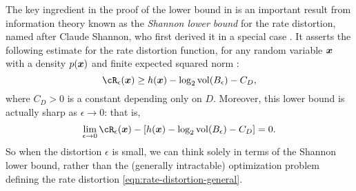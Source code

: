 \documentclass[../../book-main.tex]{subfiles}
\begin{document}
\begin{remark}\label{rem:slb}
	The key ingredient in the proof of the lower bound in
	 is an important result from
	information theory known as the \textit{Shannon lower bound} for the rate
	distortion, named after Claude Shannon, who first derived it in a special case
	\cite{shannon1959coding}. It
	asserts the following estimate for the rate distortion function, for any random
	variable $\bm{x}$ with
	a density $p(\bm{x})$ and finite expected squared norm \cite{Linder1994-ej}:
	\begin{equation}\label{eq:slb}
		\cR_{\epsilon}(\x)
		\geq
		h(\x)
		- \log_2 \volume(B_{\epsilon})
		-
		C_D,
	\end{equation}
	where $C_D > 0$ is a constant depending only on $D$. Moreover, this lower bound
	is actually sharp as $\epsilon \to 0$: that is,
	\begin{equation}
		\lim_{\epsilon \to 0} \cR_{\epsilon}(\x) - \left[ h(\x) - \log_2
		\volume(B_{\epsilon}) - C_D\right] = 0.
	\end{equation}
	So when the distortion $\epsilon$ is small, we can think solely in terms of
	the Shannon lower bound, rather than the (generally intractable)
	optimization problem defining the rate distortion
	\eqref{eqn:rate-distortion-general}.


\end{remark}
\end{document}
